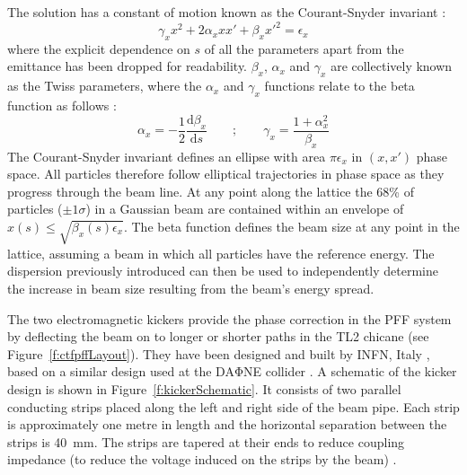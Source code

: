 The solution has a constant of motion known as the Courant-Snyder invariant \cite{courant}:
\begin{equation}
\gamma_x x^2 + 2\alpha_x x x' + \beta_x x'^2 = \epsilon_x 
\end{equation}
where the explicit dependence on \(s\) of all the parameters apart from the emittance has been dropped for readability. \(\beta_{x}\), \(\alpha_{x}\) and \(\gamma_{x}\) are collectively known as the Twiss parameters, where the \(\alpha_x\) and \(\gamma_x\) functions relate to the beta function as follows \cite{wilson}:
\begin{equation}
\alpha_x = -\frac{1}{2}\frac{\mathrm{d}\beta_x}{\mathrm{d}s}
\qquad\mathrm{;}\qquad
\gamma_x = \frac{1+\alpha_x^2}{\beta_x}
\label{e:twissEqAlpha}
\end{equation}
The Courant-Snyder invariant defines an ellipse with area \(\pi\epsilon_x\) in \((x, x')\) phase space. All particles therefore follow elliptical trajectories in phase space as they progress through the beam line. At any point along the lattice the 68\% of particles (\(\pm 1\sigma\)) in a Gaussian beam are contained within an envelope of \(x(s) \leq \sqrt{\beta_x(s)\epsilon_x}\). The beta function defines the beam size at any point in the lattice, assuming a beam in which all particles have the reference energy. The dispersion previously introduced can then be used to independently determine the increase in beam size resulting from the beam's energy spread.


The two electromagnetic kickers provide the phase correction in the PFF system by deflecting the beam on to longer or shorter paths in the TL2 chicane (see Figure~\ref{f:ctfpffLayout}). They have been designed and built by INFN, Italy \cite{infn}, based on a similar design used at the DA\(\mathrm{\Phi}\)NE collider \cite{dafneKick}. A schematic of the kicker design is shown in Figure~\ref{f:kickerSchematic}. It consists of two parallel conducting strips placed along the left and right side of the beam pipe. Each strip is approximately one metre in length and the horizontal separation between the strips is 40~mm. The strips are tapered at their ends to reduce coupling impedance (to reduce the voltage induced on the strips by the beam) \cite{kickerIPAC11}.

